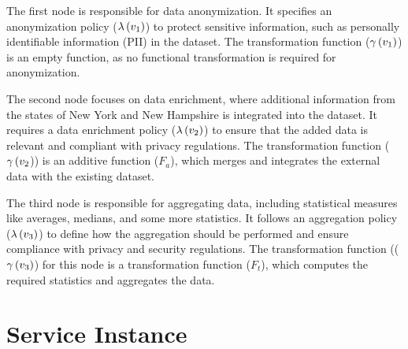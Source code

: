   \begin{enumerate*}[label=n\arabic*)]
    \item The first node is responsible for data anonymization.
          It specifies an anonymization policy ($\lambda\,(v_1)$) to protect sensitive information, such as personally identifiable information (PII) in the dataset.
          The transformation function ($\gamma\,(v_1)$) is an empty function, as no functional transformation is required for anonymization.
    \item The second node focuses on data enrichment, where additional information from the states of New York and New Hampshire is integrated into the dataset.
          It requires a data enrichment policy ($\lambda\,(v_2)$) to ensure that the added data is relevant and compliant with privacy regulations.
          The transformation function ($\gamma\,(v_2$)) is an additive function ($F_a$), which merges and integrates the external data with the existing dataset.
    \item The third node is responsible for aggregating data, including statistical measures like averages, medians, and some more statistics. It follows an aggregation policy ($\lambda\,(v_3)$) to define how the aggregation should be performed and ensure compliance with privacy and security regulations.
          The transformation function (($\gamma\,(v_3)$) for this node is a transformation function ($F_t$), which computes the required statistics and aggregates the data.
  \end{enumerate*}




\section{Service Instance}

